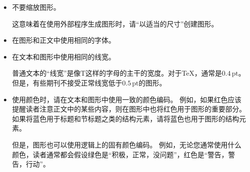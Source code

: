 %
\begin{itemize}

    \item 不要缩放图形。
    
    这意味着在使用外部程序生成图形时，请``以适当的尺寸''创建图形。
    \item 在图形和正文中使用相同的字体。

    \item 在文本和图形中使用相同的线宽。
    
    普通文本的``线宽''是像T{}这样的字母的主干的宽度。对于\TeX，通常是$0.4\,\mathrm{pt}$。但是，有些期刊不接受正常线宽低于$0.5\,\mathrm{pt}$的图形。


    \item  使用颜色时，请在文本和图形中使用一致的颜色编码。 例如，如果红色应该提醒读者注意正文中的某些内容，则在图形中也将红色用于图形的重要部分。 如果将蓝色用于标题和节标题之类的结构元素，请将蓝色也用于图形的结构元素。

    但是，图形也可以使用逻辑上的固有颜色编码。 例如，无论您通常使用什么颜色，读者通常都会假设绿色是``积极，正常，没问题''，红色是``警告，警告，行动''。
\end{itemize}


